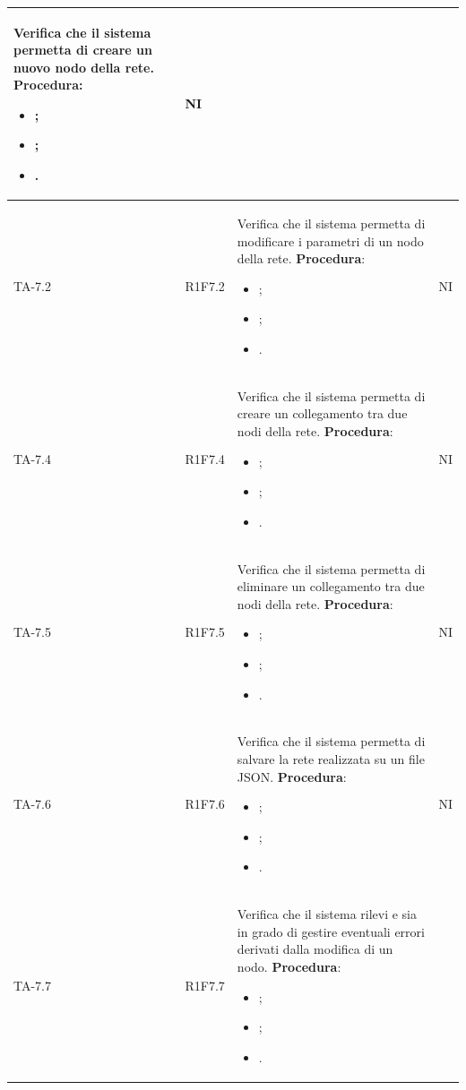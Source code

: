 \begin{longtable}{|C{2.5cm}|C{2.5cm}|L{6.5cm}|C{1.5cm}|}
	Verifica che il sistema permetta di creare un nuovo nodo della rete.
	\textbf{Procedura}:
	\begin{itemize}		
		\item ;
		\item ;
		\item .
	\end{itemize}
	 & {NI}\\
	\hline
	{TA-7.2} & {R1F7.2} & 
	Verifica che il sistema permetta di modificare i parametri di un nodo della rete.
	\textbf{Procedura}:
	\begin{itemize}		
		\item ;
		\item ;
		\item .
	\end{itemize}
	 & {NI}\\
	\hline
	{TA-7.4} & {R1F7.4} & 
	Verifica che il sistema permetta di creare un collegamento tra due nodi della rete.
	\textbf{Procedura}:
	\begin{itemize}		
		\item ;
		\item ;
		\item .
	\end{itemize}
	 & {NI}\\
	\hline
	{TA-7.5} & {R1F7.5} & 
	Verifica che il sistema permetta di eliminare un collegamento tra due nodi della rete.
	\textbf{Procedura}:
	\begin{itemize}		
		\item ;
		\item ;
		\item .
	\end{itemize}
	 & {NI}\\
	\hline
	{TA-7.6} & {R1F7.6} & 
	Verifica che il sistema permetta di salvare la rete realizzata su un file JSON.
	\textbf{Procedura}:
	\begin{itemize}		
		\item ;
		\item ;
		\item .
	\end{itemize}
	 & {NI}\\
	\hline
	{TA-7.7} & {R1F7.7} & 
	Verifica che il sistema rilevi e sia in grado di gestire eventuali errori derivati dalla modifica di un nodo.
	\textbf{Procedura}:
	\begin{itemize}		
		\item ;
		\item ;
		\item .
	\end{itemize}

\end{longtable}
